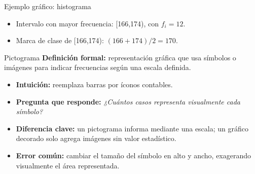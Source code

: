 \documentclass[aspectratio=169,11pt]{beamer}
\newcommand{\pregunta}[1]{\textbf{Pregunta que responde:} \emph{#1}}
\newcommand{\errorcomun}[1]{\textbf{Error común:} #1}
\newcommand{\diferencia}[1]{\textbf{Diferencia clave:} #1}
\begin{document}
\begin{frame}{Ejemplo gráfico: histograma}
\centering
{}
\vspace{0.4em}
\begin{itemize}
  \item Intervalo con mayor frecuencia: [166,174), con $f_i=12$.
  \item Marca de clase de [166,174): $(166+174)/2=170$.
\end{itemize}
\end{frame}

\begin{frame}{Pictograma}
\textbf{Definición formal:} representación gráfica que usa símbolos o imágenes para indicar frecuencias según una escala definida.
\begin{itemize}
  \item \textbf{Intuición:} reemplaza barras por íconos contables.
  \item \pregunta{¿Cuántos casos representa visualmente cada símbolo?}
  \item \diferencia{un pictograma informa mediante una escala; un gráfico decorado solo agrega imágenes sin valor estadístico.}
  \item \errorcomun{cambiar el tamaño del símbolo en alto y ancho, exagerando visualmente el área representada.}
\end{itemize}
\end{frame}
\end{document}
